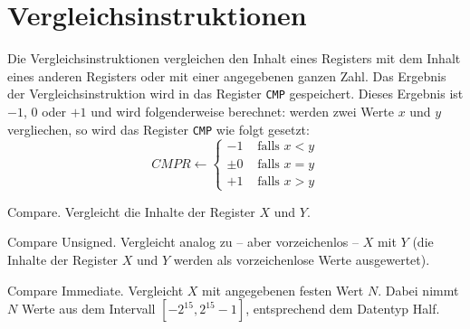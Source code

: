 \section{Vergleichsinstruktionen}
\label{sec:Vergleichsinstruktionen}

Die Vergleichsinstruktionen vergleichen den Inhalt eines Registers mit dem
Inhalt eines anderen Registers oder mit einer angegebenen ganzen Zahl. Das
Ergebnis der Vergleichsinstruktion wird in das Register \texttt{CMP}
gespeichert. Dieses Ergebnis ist $-1$, $0$ oder $+1$ und wird folgenderweise
berechnet:
werden zwei Werte $x$ und $y$ vergliechen, so wird das Register \texttt{CMP}
wie folgt gesetzt:
\[
    CMPR \gets
    \begin{cases}
        -1 & \text{ falls } x < y  \\
     \pm 0 & \text{ falls } x = y  \\
        +1 & \text{ falls } x > y 
    \end{cases}
\]

\glqq Compare\grqq.
Vergleicht die Inhalte der Register $X$ und $Y$.


\glqq Compare Unsigned\grqq.
Vergleicht analog zu  -- aber vorzeichenlos -- $X$ mit $Y$
(die Inhalte der Register $X$ und $Y$ werden als vorzeichenlose Werte
ausgewertet).


\glqq Compare Immediate\grqq. 
Vergleicht $X$ mit angegebenen festen Wert $N$.
Dabei nimmt $N$ Werte aus dem Intervall
$[-2^{15}, 2^{15}-1]$, entsprechend dem Datentyp \glqq Half\grqq.


